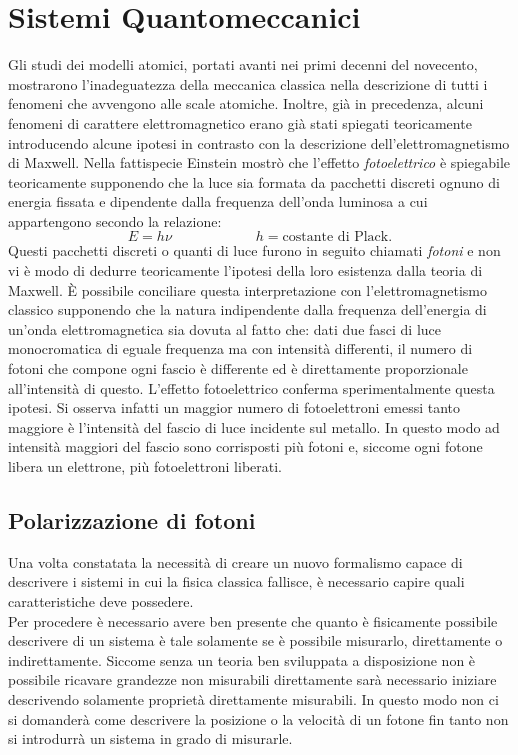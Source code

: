 \section{Sistemi Quantomeccanici}

Gli studi dei modelli atomici, portati avanti nei primi decenni del novecento, mostrarono l'inadeguatezza della meccanica classica nella descrizione di tutti i fenomeni che avvengono alle scale atomiche. Inoltre, già in precedenza, alcuni fenomeni di carattere elettromagnetico erano già stati spiegati teoricamente introducendo alcune ipotesi in contrasto con la descrizione dell'elettromagnetismo di Maxwell. Nella fattispecie Einstein mostrò che l'effetto \emph{fotoelettrico} è spiegabile teoricamente supponendo che la luce sia formata da pacchetti discreti ognuno di energia fissata e dipendente dalla frequenza dell'onda luminosa a cui appartengono secondo la relazione:
\begin{equation}
    E=h\nu\qquad\qquad\qquad h=\text{costante di Plack}. \label{relazione Planck}
\end{equation}  
Questi pacchetti discreti o quanti di luce furono in seguito chiamati \emph{fotoni} e non vi è modo di dedurre teoricamente l'ipotesi della loro esistenza dalla teoria di Maxwell. È possibile conciliare questa interpretazione con l'elettromagnetismo classico supponendo che la natura indipendente dalla frequenza dell'energia di un'onda elettromagnetica sia dovuta al fatto che: dati due fasci di luce monocromatica di eguale frequenza ma con intensità differenti, il numero di fotoni che compone ogni fascio è differente ed è direttamente proporzionale all'intensità di questo. L'effetto fotoelettrico conferma sperimentalmente questa ipotesi. Si osserva infatti un maggior numero di fotoelettroni emessi tanto maggiore è l'intensità del fascio di luce incidente sul metallo. In questo modo ad intensità maggiori del fascio sono corrisposti più fotoni e, siccome ogni fotone libera un elettrone, più fotoelettroni liberati.

\subsection{Polarizzazione di fotoni}

Una volta constatata la necessità di creare un nuovo formalismo capace di descrivere i sistemi in cui la fisica classica fallisce, è necessario capire quali caratteristiche deve possedere.\\ Per procedere è necessario avere ben presente che quanto è fisicamente possibile descrivere di un sistema è tale solamente se è possibile misurarlo, direttamente o indirettamente. Siccome senza un teoria ben sviluppata a disposizione non è possibile ricavare grandezze non misurabili direttamente sarà necessario iniziare descrivendo solamente proprietà direttamente misurabili. In questo modo non ci si domanderà come descrivere la posizione o la velocità di un fotone fin tanto non si introdurrà un sistema in grado di misurarle.\\


